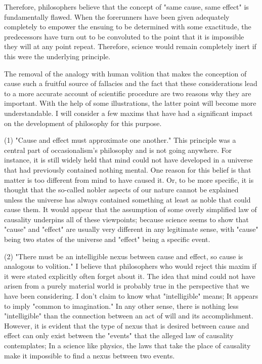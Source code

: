 \documentclass[a4paper,12pt]{book}[2004/02/16]
\theoremstyle{ilemma}
\theoremstyle{itheorem}
\theoremstyle{iother}
\theoremstyle{icorollary}
\theoremstyle{numcorollary}
\theoremstyle{idefinition}
\begin{document}
Therefore, philosophers believe that the concept of "same cause, same effect" is fundamentally flawed. When the
forerunners have been given adequately completely to empower the
ensuing to be determined with some exactitude, the predecessors have
turn out to be convoluted to the point that it is impossible they will at any point repeat.
Therefore, science would remain completely inert if this were the underlying principle.

The removal of the analogy with human volition that makes the conception of cause such a fruitful source of fallacies and the fact that these considerations lead to a more accurate account of scientific procedure are two reasons why they are important. With the help of some illustrations, the latter point will become more understandable.
I will consider a few maxims that have had a significant impact on the development of philosophy for this purpose.

(1) "Cause and effect must approximate one another." This principle was a central part of occasionalism's philosophy and is not going anywhere. For instance, it is still widely held that mind could not have developed in a universe that had previously contained nothing mental. One reason for this belief is that matter is too different from mind to have caused it. Or, to be more specific, it is thought that the so-called nobler aspects of our nature cannot be explained unless the universe has always contained something at least as noble that could cause them. It would appear that the assumption of some overly simplified law of causality underpins all of these viewpoints; because science seems to show that "cause" and "effect" are usually very different in any legitimate sense, with "cause" being two states of the universe and "effect" being a specific event.

(2) "There must be an intelligible nexus between cause and effect, so cause is analogous to volition." I believe that philosophers who would reject this maxim if it were stated explicitly often forget about it. The idea that mind could not have arisen from a purely material world is probably true in the perspective that we have been considering. I don't claim to know what "intelligible" means; It appears to imply "common to imagination." In any other sense, there is nothing less "intelligible" than the connection between an act of will and its accomplishment. However, it is evident that the type of nexus that is desired between cause and effect can only exist between the "events" that the alleged law of causality contemplates; In a science like physics, the laws that take the place of causality make it impossible to find a nexus between two events.
\end{document}
